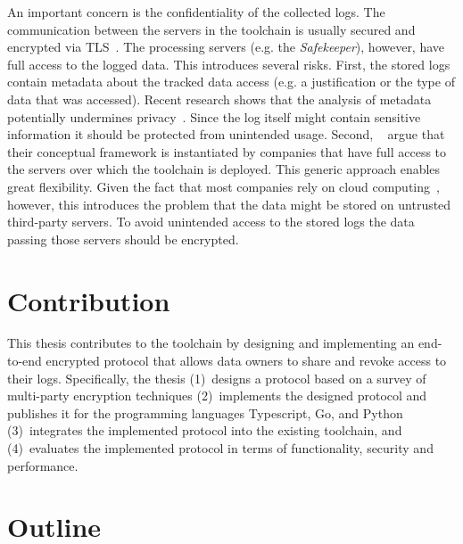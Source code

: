 \documentclass[../main.tex]{subfiles}
\begin{document}
An important concern is the confidentiality of the collected logs.
The communication between the servers in the toolchain is usually secured and encrypted via TLS~\cite{Rescorla2000}.
The processing servers (e.g. the \emph{Safekeeper}), however, have full access to the logged data.
This introduces several risks.
First, the stored logs contain metadata about the tracked data access (e.g. a justification or the type of data that was accessed).
Recent research shows that the analysis of metadata potentially undermines privacy~\cite{Greschbach2012,Mayer2016}.
Since the log itself might contain sensitive information it should be protected from unintended usage.
Second, \citeauthor{Zieglmeier2021}~\cite{Zieglmeier2021} argue that their conceptual framework is instantiated by companies that have full access to the servers over which the toolchain is deployed.
This generic approach enables great flexibility.
Given the fact that most companies rely on cloud computing~\cite{Weber2021}, however, this introduces the problem that the data might be stored on untrusted third-party servers.
To avoid unintended access to the stored logs the data passing those servers should be encrypted.

\section{Contribution}

This thesis contributes to the toolchain by designing and implementing an end-to-end encrypted protocol that allows data owners to share and revoke access to their logs.
Specifically, the thesis 
(1)~designs a protocol based on a survey of multi-party encryption techniques
(2)~implements the designed protocol and publishes it for the programming languages Typescript, Go, and Python
(3)~integrates the implemented protocol into the existing toolchain, and 
(4)~evaluates the implemented protocol in terms of functionality, security and performance.

\section{Outline}
\end{document}
